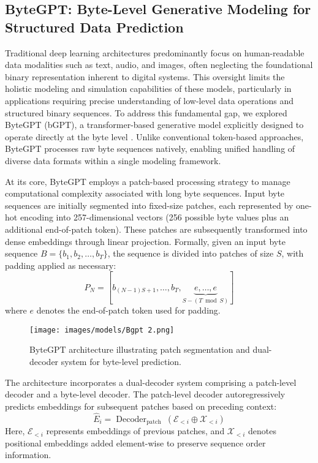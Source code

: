 \documentclass[a4paper, 11pt, twoside, openright]{report}
\begin{document}
\subsection{ByteGPT: Byte-Level Generative Modeling for Structured Data Prediction}

Traditional deep learning architectures predominantly focus on human-readable data modalities such as text, audio, and images, often neglecting the foundational binary representation inherent to digital systems. This oversight limits the holistic modeling and simulation capabilities of these models, particularly in applications requiring precise understanding of low-level data operations and structured binary sequences. To address this fundamental gap, we explored ByteGPT (bGPT), a transformer-based generative model explicitly designed to operate directly at the byte level \cite{ByteGPT2024}. Unlike conventional token-based approaches, ByteGPT processes raw byte sequences natively, enabling unified handling of diverse data formats within a single modeling framework.

At its core, ByteGPT employs a patch-based processing strategy to manage computational complexity associated with long byte sequences. Input byte sequences are initially segmented into fixed-size patches, each represented by one-hot encoding into 257-dimensional vectors (256 possible byte values plus an additional end-of-patch token). These patches are subsequently transformed into dense embeddings through linear projection. Formally, given an input byte sequence \( B = \{b_1, b_2, \dots, b_T\} \), the sequence is divided into patches of size \( S \), with padding applied as necessary:
\[
P_{N} = [b_{(N-1)S+1}, \dots, b_{T}, \underbrace{e,\dots,e}_{S-(T\bmod S)}]
\]
where \( e \) denotes the end-of-patch token used for padding.

\begin{figure}[h!]
    \centering
    \texttt{[image: images/models/Bgpt 2.png]}
    \caption{ByteGPT architecture illustrating patch segmentation and dual-decoder system for byte-level prediction.}
    \label{fig:bgpt_architecture}
\end{figure}

The architecture incorporates a dual-decoder system comprising a patch-level decoder and a byte-level decoder. The patch-level decoder autoregressively predicts embeddings for subsequent patches based on preceding context:
\[
\hat{E}_{i}=\operatorname{Decoder}_{\text {patch }}(\mathcal{E}_{<i} \oplus \mathcal{X}_{<i})
\]
Here, \( \mathcal{E}_{<i} \) represents embeddings of previous patches, and \( \mathcal{X}_{<i} \) denotes positional embeddings added element-wise to preserve sequence order information.
\end{document}
